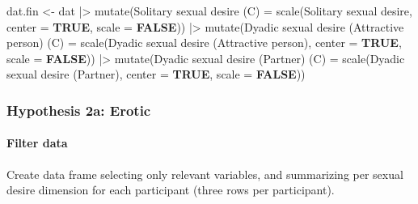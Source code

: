 \documentclass[
  bookmarksnumbered]{article}
\newenvironment{Shaded}{\begin{snugshade}}{\end{snugshade}}
\newcommand{\AttributeTok}[1]{\textcolor[rgb]{0.80,0.80,0.80}{#1}}
\newcommand{\ConstantTok}[1]{\textcolor[rgb]{0.86,0.64,0.64}{\textbf{#1}}}
\newcommand{\FunctionTok}[1]{\textcolor[rgb]{0.94,0.94,0.56}{#1}}
\newcommand{\NormalTok}[1]{\textcolor[rgb]{0.80,0.80,0.80}{#1}}
\newcommand{\OtherTok}[1]{\textcolor[rgb]{0.94,0.94,0.56}{#1}}
\newcommand{\SpecialCharTok}[1]{\textcolor[rgb]{0.86,0.64,0.64}{#1}}
\newcommand{\StringTok}[1]{\textcolor[rgb]{0.80,0.58,0.58}{#1}}
\begin{document}
\begin{Shaded}
\begin{Highlighting}[]
\NormalTok{dat.fin }\OtherTok{\textless{}{-}}\NormalTok{ dat }\SpecialCharTok{|\textgreater{}}
  \FunctionTok{mutate}\NormalTok{(}\StringTok{\textasciigrave{}}\AttributeTok{Solitary sexual desire (C)}\StringTok{\textasciigrave{}} \OtherTok{=} 
           \FunctionTok{scale}\NormalTok{(}\StringTok{\textasciigrave{}}\AttributeTok{Solitary sexual desire}\StringTok{\textasciigrave{}}\NormalTok{,}
                 \AttributeTok{center =} \ConstantTok{TRUE}\NormalTok{, }\AttributeTok{scale =} \ConstantTok{FALSE}\NormalTok{)) }\SpecialCharTok{|\textgreater{}}
  \FunctionTok{mutate}\NormalTok{(}\StringTok{\textasciigrave{}}\AttributeTok{Dyadic sexual desire (Attractive person) (C)}\StringTok{\textasciigrave{}} \OtherTok{=} 
           \FunctionTok{scale}\NormalTok{(}\StringTok{\textasciigrave{}}\AttributeTok{Dyadic sexual desire (Attractive person)}\StringTok{\textasciigrave{}}\NormalTok{, }
                 \AttributeTok{center =} \ConstantTok{TRUE}\NormalTok{, }\AttributeTok{scale =} \ConstantTok{FALSE}\NormalTok{)) }\SpecialCharTok{|\textgreater{}}
  \FunctionTok{mutate}\NormalTok{(}\StringTok{\textasciigrave{}}\AttributeTok{Dyadic sexual desire (Partner) (C)}\StringTok{\textasciigrave{}} \OtherTok{=} 
           \FunctionTok{scale}\NormalTok{(}\StringTok{\textasciigrave{}}\AttributeTok{Dyadic sexual desire (Partner)}\StringTok{\textasciigrave{}}\NormalTok{,}
                 \AttributeTok{center =} \ConstantTok{TRUE}\NormalTok{, }\AttributeTok{scale =} \ConstantTok{FALSE}\NormalTok{))}
\end{Highlighting}
\end{Shaded}

\hypertarget{hypothesis2a}{%
\subsubsection{Hypothesis 2a: Erotic}\label{hypothesis2a}}

\hypertarget{filter-data-1}{%
\paragraph{Filter data}\label{filter-data-1}}

Create data frame selecting only relevant variables, and summarizing per sexual desire dimension for each participant (three rows per participant).
\end{document}
